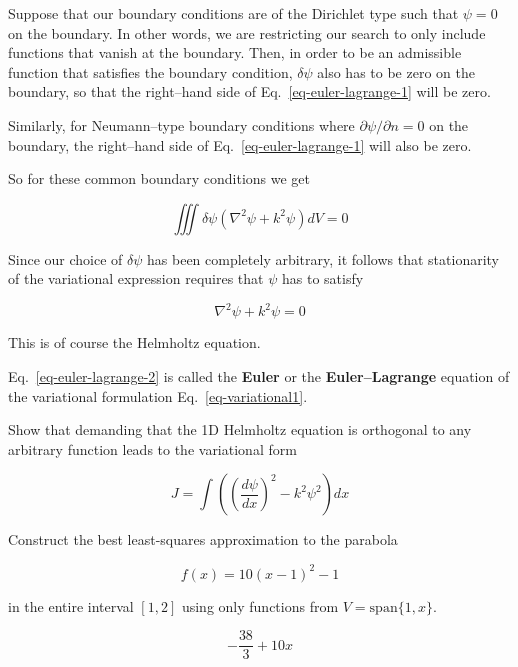 Suppose that our boundary conditions are of the Dirichlet type such that $\psi=0$ on the boundary. In other words, we are restricting our search to only include functions that vanish at the boundary. Then, in order to be an admissible function that satisfies the boundary condition, $\delta \psi$ also has to be zero on the boundary, so that the right--hand side of Eq.~\ref{eq-euler-lagrange-1} will be zero.

Similarly, for Neumann--type boundary conditions where $\partial \psi / \partial n = 0$ on the boundary, the right--hand side of Eq.~\ref{eq-euler-lagrange-1} will also be zero.

So for these common boundary conditions we get

\begin{equation}
\iiint \delta \psi (\nabla^2 \psi + k^2 \psi ) dV = 0
\end{equation} 

Since our choice of $\delta \psi$ has been completely arbitrary, it follows that stationarity of the variational expression requires that $\psi$ has to satisfy

\begin{equation}
\nabla^2 \psi + k^2 \psi = 0 \label{eq-euler-lagrange-2}
\end{equation} 

This is of course the Helmholtz equation.

Eq.~\ref{eq-euler-lagrange-2} is called the \textbf{Euler} or the \textbf{Euler--Lagrange} equation of the variational formulation Eq.~\ref{eq-variational1}.


\begin{exer}
Show that demanding that the 1D Helmholtz equation is orthogonal to any arbitrary function leads to the variational form 

$$J = \int \left( \left(\frac{d \psi}{d x}\right)^2 - k^2 \psi^2 \right) dx$$

\end{exer}


\begin{exer}
  
Construct the best least-squares approximation to the parabola 

$$f(x) = 10(x-1)^2 -1$$ 

in the entire interval $[1,2]$ using only functions from $V = \mathrm{span} \{1, x\}$.

\begin{sol}
$$-\frac{38}{3} + 10x$$   
\end{sol}
\end{exer}


